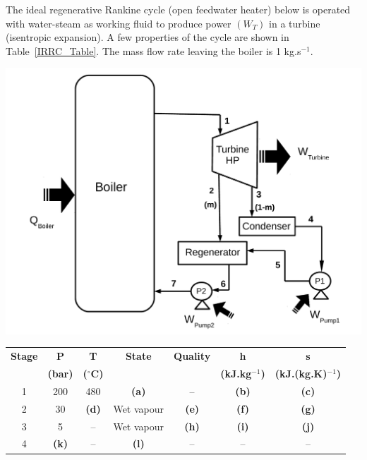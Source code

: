 \documentclass[calculator,steamtables,refrigeranttables,psychrometricchart,datasheet,solutions,resit]{exam}
\begin{document}
\clearpage

\begin{question}
The ideal regenerative Rankine cycle (open feedwater heater) below is operated with water-steam as working fluid to produce power $\left(W_{T}\right)$ in a turbine (isentropic expansion). A few properties of the cycle are shown in Table~\ref{IRRC_Table}. The mass flow rate leaving the boiler is 1 kg.s$^{-1}$.
      \begin{center}
      \includegraphics[width=10.cm,clip]{./Pics/Exam_Reheat_Regenerative2_Rankine_Cycle}
     \end{center} 
\begin{table}[b]
\begin{center}
\begin{tabular}{c | c c c c c c} 
\hline
{\bf Stage} & {\bf P}       & {\bf T}            &  {\bf State}  &  {\bf Quality}  & {\bf h}             & {\bf s}                  \\
            & {\bf (bar)}   & {\bf ($^{\circ}$C)} &               &                 &{\bf (kJ.kg$^{-1}$)}  & {\bf (kJ.(kg.K)$^{-1}$)}  \\
\hline
1           &  200          & 480                &  {\bf (a)}    &   --            & {\bf (b)}           & {\bf (c)}                 \\
2           &  30           & {\bf (d)}          &  Wet vapour   & {\bf (e)}       & {\bf (f)}           & {\bf (g)}                \\
3           &  5            & --                 &  Wet vapour   & {\bf (h)}       & {\bf (i)}           & {\bf (j)}                \\
4           &  {\bf (k)}    &  --                &  {\bf (l)}    & --              &   --                &   --                      \\

\end{tabular}
\end{center}
\end{table}
\end{question}
\end{document}
